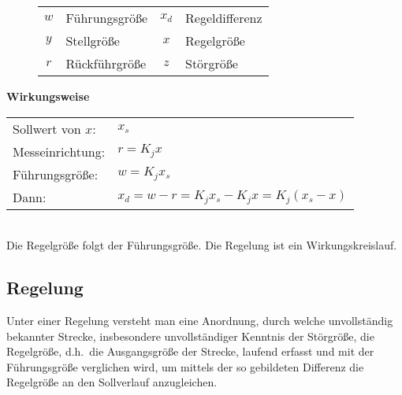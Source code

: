 \begin{figure}[!h]
  \centering
  \vspace{2em}

  \begin{tabular}{clcl}
    \(w\) & Führungsgröße & \(x_d\) & Regeldifferenz\\
    \(y\) & Stellgröße & \(x\) & Regelgröße\\
    \(r\) & Rückführgröße & \(z\) & Störgröße\\
  \end{tabular}
\end{figure}

\textbf{Wirkungsweise}\\
\begin{tabular}{ll}
  Sollwert von \(x\): & \(x_s\)\\
  Messeinrichtung: & \(r = K_j x\)\\
  Führungsgröße: & \(w = K_j x_s\)\\
  Dann: & \(x_d = w - r = K_j x_s - K_j x = K_j (x_s - x)\)\\
\end{tabular}\\
Die Regelgröße folgt der Führungsgröße. Die Regelung ist ein Wirkungskreislauf.\\

\subsection{Regelung}
Unter einer Regelung versteht man eine Anordnung, durch welche unvollständig bekannter Strecke,
insbesondere unvollständiger Kenntnis der Störgröße, die Regelgröße, d.h.\ die Ausgangsgröße der Strecke,
laufend erfasst und mit der Führungsgröße verglichen wird, um mittels der so gebildeten Differenz die
Regelgröße an den Sollverlauf anzugleichen.

